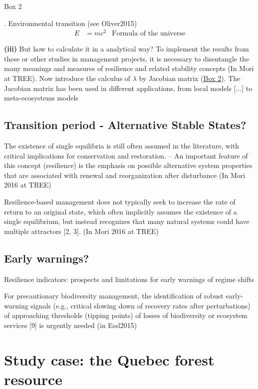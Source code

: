 \begin{tcolorbox}
\hypertarget{box2}{Box 2}. Environmental transition (see Oliver2015)
\begin{align}
E &= mc^2 & \text{Formula of the universe}
\end{align}
\end{tcolorbox}

\textbf{(iii)} But how to calculate it in a analytical way?
To implement the results from these or other studies in management projects, it is necessary to disentangle the many meanings and measures of resilience and related stability concepts (In Mori at TREE).
Now introduce the calculus of $\lambda$ by Jacobian matrix (\hyperlink{box2}{Box 2}).
The Jacobian matrix has been used in different applications, from local models [...] to meta-ecosystems models \citep{Gravel2016}

\subsection{Transition period - Alternative Stable States?}
The existence of single equilibria is still often assumed in the literature, with critical implications for conservation and restoration. -- An important feature of this concept (resilience) is the emphasis on possible alternative system properties that are associated with renewal and reorganization after disturbance (In Mori 2016 at TREE)

Resilience-based management does not typically seek to increase the rate of return to an original state, which often implicitly assumes the existence of a single equilibrium, but instead recognizes that many natural systems could have multiple attractors [2, 3]. (In Mori 2016 at TREE)

\subsection{Early warnings?}

Resilience indicators: prospects and limitations for early warnings of regime shifts

For precautionary biodiversity management, the identification of robust early-warning signals (e.g., critical slowing down of recovery rates after perturbations) of approaching thresholds (tipping points) of losses of biodiversity or ecosystem services [9] is urgently needed (in Essl2015)

\section{Study case: the Quebec forest resource}

